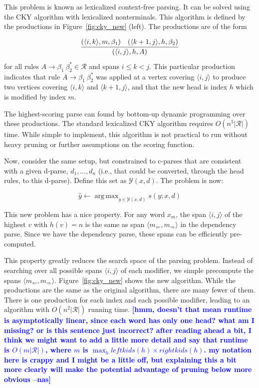 \documentclass[11pt,letterpaper]{article}
\DeclareMathOperator*{\argmax}{arg\,max}
\newcommand{\rules}{\mathcal{R}}
\newcommand{\Left}[1]{#1_{\Leftarrow}}
\newcommand{\Right}[1]{#1_{\Rightarrow}}
\newcommand{\Span}[1]{\langle #1 \rangle}
\newcommand{\RuleB}[3]{#1 \rightarrow #2\ #3^*}
\newcommand{\nascomment}[1]{\textcolor{blue}{\bf \small [#1 --nas]}}
\begin{document}
This problem is known as lexicalized context-free parsing. It can be
solved using the  CKY algorithm with lexicalized nonterminals.
This algorithm is defined by the productions
in Figure~\ref{fig:cky_new} (left). The productions are of the form

\[ \infer{(\Span{i, j}, h, A)}{(\Span{i, k}, m, \beta_1) & (\Span{k+1,
    j}, h, \beta_2)} \] for all rules $\RuleB{A}{\beta_1}{\beta_2}\in
\rules$ and spans $i \leq k < j$. This particular production indicates that
rule $\RuleB{A}{\beta_1}{\beta_2}$ was applied at a vertex covering
$\Span{i, j}$ to produce two vertices covering $\Span{i, k}$ and
$\Span{k+1, j}$, and that the new head is index $h$ which is modified
by index $m$.

The highest-scoring parse can found by bottom-up dynamic programming
over these productions. The standard lexicalized CKY algorithm requires $O(n^5
|\rules|)$ time. While simple to implement, this algorithm is not practical to run without heavy pruning or
further assumptions on the scoring function\cite{eisner1999efficient}. 

Now, consider the same setup, but constrained to c-parses
that are consistent with a given d-parse, $d_1, \ldots, d_n$ (i.e.,
that could be converted, through the head rules, to this d-parse).
Define this set as  $\mathcal{Y}(x,d)$.  The problem is now:


\[ \hat{y} \leftarrow \argmax_{y \in \mathcal{Y}(x, d)} s(y; x, d)\]

This new problem has a nice property. For any word $x_m$, the span $\Span{i,j}$ of the highest $v$ with $h(v) = n$  is the same as span $\Span{\Left{m},\Right{m}}$ in the dependency parse. Since we have the dependency parse, these spans can be efficiently pre-computed.

This property greatly reduces the search space of the parsing problem.
Instead of searching over all possible spans $\Span{i, j}$ of each modifier, we simple precompute the spans $\langle \Left{m},\Right{m}\rangle$. Figure~\ref{fig:cky_new} shows the new algorithm.
While the productions are the same as the original algorithm, there are many fewer of them. 
There is one production for each index and each possible modifier,
leading to an algorithm with $O(n^2|\rules|)$ running
time. \nascomment{hmm, doesn't that mean runtime is asymptotically linear, since each
  word has only one head? what am I missing?  or is this sentence just
incorrect?  after reading ahead a bit, I think we might want to add a
little more detail and say that runtime is $O(m |\rules|)$, where $m$
is $\max_h \mathit{leftkids}(h) \times \mathit{rightkids}(h)$.  my
notation here is crappy and I might be a little off, but explaining
this a bit more clearly will make the potential advantage of pruning
below more obvious}
\end{document}
